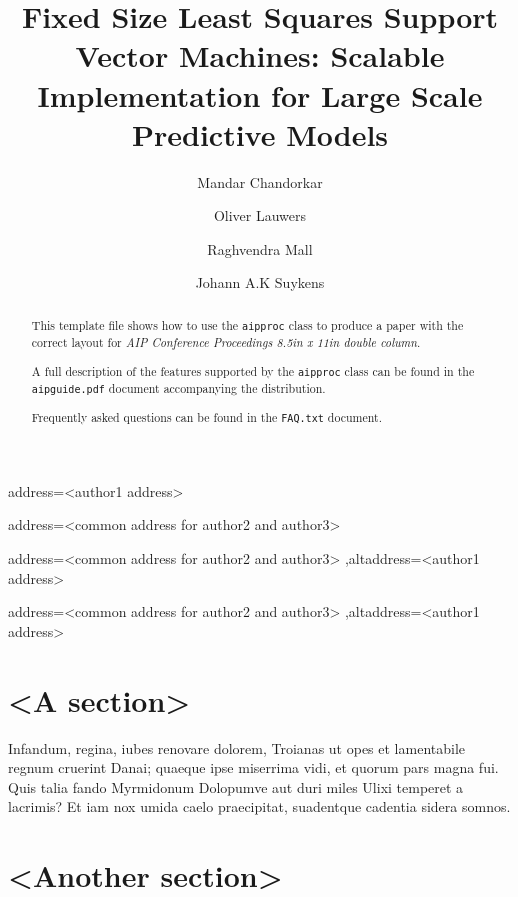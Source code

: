 \documentclass[
    ,final            %
  ]
  {aipproc}
\begin{document}
\title{Fixed Size Least Squares Support Vector Machines: Scalable Implementation for Large Scale Predictive Models}


\author{Mandar Chandorkar}{
  address={<author1 address>}
}

\author{Oliver Lauwers}{
  address={<common address for author2 and author3>}
}

\author{Raghvendra Mall}{
  address={<common address for author2 and author3>}
  ,altaddress={<author1 address>} %
}

\author{Johann A.K Suykens}{
  address={<common address for author2 and author3>}
  ,altaddress={<author1 address>} %
}


\begin{abstract}
 This template file shows how to use the \texttt{aipproc} class to
 produce a paper with the correct layout for \emph{%
   AIP Conference Proceedings  8.5in x 11in double column}.

 A full description of the features supported by the \texttt{aipproc}
 class can be found in the \texttt{aipguide.pdf} document accompanying
 the distribution.

 Frequently asked questions can be found in the \texttt{FAQ.txt}
 document.
\end{abstract}

\maketitle


\section{<A section>}

  Infandum, regina, iubes renovare dolorem, Troianas ut opes et
  lamentabile regnum cruerint Danai; quaeque ipse miserrima vidi, et
  quorum pars magna fui. Quis talia fando Myrmidonum Dolopumve aut
  duri miles Ulixi temperet a lacrimis? Et iam nox umida caelo
  praecipitat, suadentque cadentia sidera somnos.

\section{<Another section>}
\end{document}
